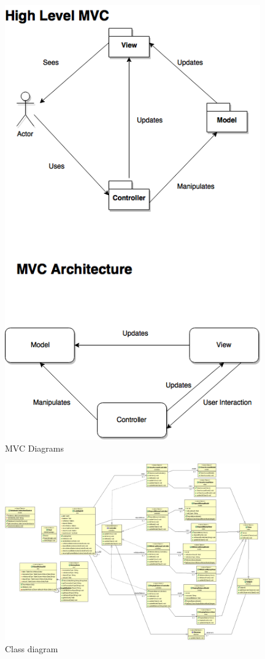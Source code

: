 \documentclass[12pt]{article}
\begin{document}
\begin{figure}[h!]
  \centering
  \includegraphics[width=110mm]{MVC.png}
  \caption{MVC Diagrams}
\end{figure}

\begin{figure}[h!]
  \centering
  \includegraphics[width=110mm]{class_diagram.png}
  \caption{Class diagram}
\end{figure}
\end{document}
